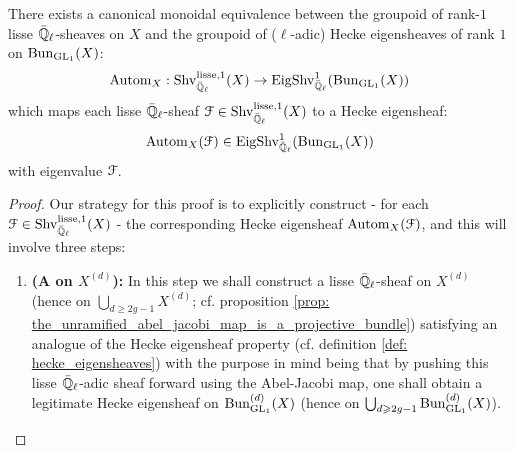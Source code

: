             \begin{theorem} \label{theorem: unramified_abelian_geometric_class_field_theory}
                There exists a canonical monoidal equivalence between the groupoid of rank-$1$ lisse $\bar{\mathbb{Q}}_{\ell}$-sheaves on $X$ and the groupoid of ($\ell$-adic) Hecke eigensheaves of rank $1$ on $\mathrm{Bun}_{\mathrm{GL}_1}(X)$:
                    $$\mathrm{Autom}_X: \mathrm{Shv}_{\bar{\mathbb{Q}}_{\ell}}^{\mathrm{lisse}, 1}(X) \to \mathrm{Eig}\mathrm{Shv}_{\bar{\mathbb{Q}}_{\ell}}^1(\mathrm{Bun}_{\mathrm{GL}_1}(X))$$
                which maps each lisse $\bar{\mathbb{Q}}_{\ell}$-sheaf $\mathcal{F} \in \mathrm{Shv}_{\bar{\mathbb{Q}}_{\ell}}^{\mathrm{lisse}, 1}(X)$ to a Hecke eigensheaf:
                    $$\mathrm{Autom}_X(\mathcal{F}) \in \mathrm{Eig}\mathrm{Shv}_{\bar{\mathbb{Q}}_{\ell}}^1(\mathrm{Bun}_{\mathrm{GL}_1}(X))$$
                with eigenvalue $\mathcal{F}$.
            \end{theorem}
                \begin{proof}
                    Our strategy for this proof is to explicitly construct - for each $\mathcal{F} \in \mathrm{Shv}_{\bar{\mathbb{Q}}_{\ell}}^{\mathrm{lisse}, 1}(X)$ - the corresponding Hecke eigensheaf $\mathrm{Autom}_X(\mathcal{F})$, and this will involve three steps:
                        \begin{enumerate}
                            \item \textbf{(A  on $X^{(d)}$):} In this step we shall construct a lisse $\bar{\mathbb{Q}}_{\ell}$-sheaf on $X^{(d)}$ (hence on $\bigcup_{d \geq 2g - 1} X^{(d)}$; cf. proposition \ref{prop: the_unramified_abel_jacobi_map_is_a_projective_bundle}) satisfying an analogue of the Hecke eigensheaf property (cf. definition \ref{def: hecke_eigensheaves}) with the purpose in mind being that by pushing this lisse $\bar{\mathbb{Q}}_{\ell}$-adic sheaf forward using the Abel-Jacobi map, one shall obtain a legitimate Hecke eigensheaf on $\mathrm{Bun}_{\mathrm{GL}_1}^{(d)}(X)$ (hence on $\bigcup_{d \geqslant 2g - 1} \mathrm{Bun}_{\mathrm{GL}_1}^{(d)}(X)$).
                            

\end{enumerate}
\end{proof}
